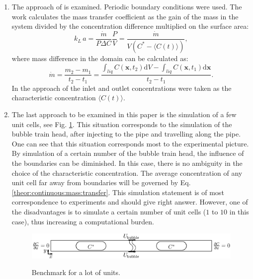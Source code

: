 \documentclass{article}
\newcommand{\beq}{\begin{equation}}
\newcommand{\feq}{\end{equation}}
\newcommand{\vol}{k_L\,a}
\newcommand{\cstar}{C^{*}}
\begin{document}
\begin{enumerate}
\item
The approach of \citet{vanbaten-circular} is examined. Periodic boundary conditions were used. The work \cite{vanbaten-circular}
calculates the mass transfer coefficient as the gain of the mass in the system
divided by the concentration difference
multiplied on the surface area:
\beq
\label{eq:vanbaten:formulation}
\vol=\frac{\dot{m}}{P \Delta C}\frac{P}{V}=\frac{\dot{m}}{V (\cstar-\langle C(t) \rangle)},
\feq
where mass difference in the domain can be calculated as:
\beq
\dot{m}=\frac{m_2-m_1}{t_2-t_1}=\frac{\int_{liq}{C(\bm{x},t_2)\mathrm{d}V}-\int_{liq}{
C(\bm{x},t_1)\mathrm { d } \bm{x}} } {
t_2-t_1 }.
\feq
In the approach of \citeauthor{vanbaten-circular} the inlet and outlet concentrations were taken as the
characteristic concentration $\langle C(t) \rangle $.

\item 
The last approach to be examined in this paper is the simulation of a few unit cells, see Fig. \ref{fig:benchmark:alot}. This situation corresponds to the simulation of the
bubble train head, after injecting to the pipe and travelling along the pipe. One can see that this
situation corresponds most to the experimental picture. By simulation of a certain number of the
bubble train head, the influence of the boundaries can be
diminished. In this case, there is no ambiguity in the choice of the
characteristic concentration. The average concentration of any unit cell far away from boundaries will be governed
by Eq.
\ref{theor:continuous:mass:transfer}. This simulation statement is of most correspondence to
experiments and should give right answer. However, one of the
disadvantages is to simulate a certain number of unit cells ($1$ to $10$ in this case), thus
increasing a computational
burden.
\begin{figure}[htb!]
\includegraphics[width=\textwidth]{Figures/benchmark_alot.eps}\\
\caption{Benchmark for a lot of units. \label{fig:benchmark:alot}}
\end{figure}
\end{enumerate} 
\end{document}
